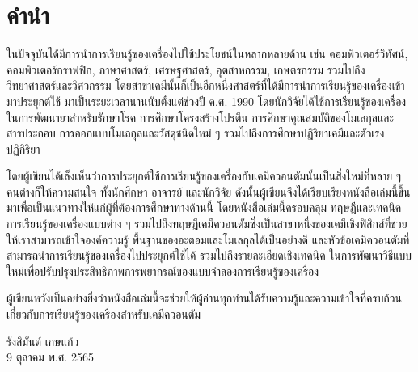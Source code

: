 

{

\chapter*{\centering คำนำ}

ในปัจจุบันได้มีการนำการเรียนรู้ของเครื่องไปใช้ประโยชน์ในหลากหลายด้าน เช่น คอมพิวเตอร์วิทัศน์, คอมพิวเตอร์กราฟฟิก, ภาษาศาสตร์, เศรษฐศาสตร์, 
อุตสาหกรรม, เกษตรกรรม รวมไปถึงวิทยาศาสตร์และวิศวกรรม โดยสาขาเคมีนั้นก็เป็นอีกหนึ่งศาสตร์ที่ได้มีการนำการเรียนรู้ของเครื่องเข้ามาประยุกต์ใช้%
มาเป็นระยะเวลานานนับตั้งแต่ช่วงปี ค.ศ. 1990 โดยนักวิจัยได้ใช้การเรียนรู้ของเครื่องในการพัฒนายาสำหรับรักษาโรค การศึกษาโครงสร้างโปรตีน 
การศึกษาคุณสมบัติของโมเลกุลและสารประกอบ การออกแบบโมเลกุลและวัสดุชนิดใหม่ ๆ รวมไปถึงการศึกษาปฏิริยาเคมีและตัวเร่งปฏิกิริยา

โดยผู้เขียนได้เล็งเห็นว่าการประยุกต์ใช้การเรียนรู้ของเครื่องกับเคมีควอนตัมนั้นเป็นสิ่งใหม่ที่หลาย ๆ คนต่างก็ให้ความสนใจ ทั้งนักศึกษา อาจารย์ 
และนักวิจัย ดังนั้นผู้เขียนจึงได้เรียบเรียงหนังสือเล่มนี้ขึ้นมาเพื่อเป็นแนวทางให้แก่ผู้ที่ต้องการศึกษาทางด้านนี้ โดยหนังสือเล่มนี้ครอบคลุม%
ทฤษฎีและเทคนิคการเรียนรู้ของเครื่องแบบต่าง ๆ รวมไปถึงทฤษฎีเคมีควอนตัมซึ่งเป็นสาขาหนึ่งของเคมีเชิงฟิสิกส์ที่ช่วยให้เราสามารถเข้าใจองค์ความรู้%
พื้นฐานของอะตอมและโมเลกุลได้เป็นอย่างดี และหัวข้อเคมีควอนตัมที่สามารถนำการเรียนรู้ของเครื่องไปประยุกต์ใช้ได้ รวมไปถึงรายละเอียดเชิงเทคนิค%
ในการพัฒนาวิธีแบบใหม่เพื่อปรับปรุงประสิทธิภาพการพยากรณ์ของแบบจำลองการเรียนรู้ของเครื่อง

ผู้เขียนหวังเป็นอย่างยิ่งว่าหนังสือเล่มนี้จะช่วยให้ผู้อ่านทุกท่านได้รับความรู้และความเข้าใจที่ครบถ้วนเกี่ยวกับการเรียนรู้ของเครื่องสำหรับเคมีควอนตัม

\medskip

\begin{flushright}
รังสิมันต์ เกษแก้ว \\
9 ตุลาคม พ.ศ. 2565
\end{flushright}
}
